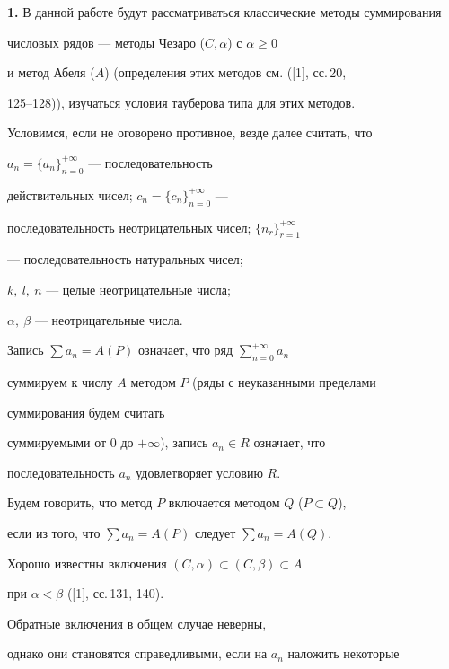 \label{begin}








{\bf 1.} В данной работе будут рассматриваться классические методы суммирования 


числовых рядов --- методы Чезаро ($C,\alpha$) с $\alpha \ge 0$


и метод Абеля ($A$) (определения этих методов см. ([1], сс.\,20,


125--128)), изучаться условия тауберова типа для этих методов.


 


Условимся, если не оговорено противное, везде далее считать, что 


${a_n} = \{a_n \}_{n=0}^{+\infty}$ --- последовательность


действительных чисел; $c_n=\{c_n \}_{n=0}^{+\infty}$ --- 


последовательность неотрицательных чисел; $\{n_r \}_{r=1}^{+\infty}$


--- последовательность натуральных чисел; 


$k,\ l,\ n$ --- целые неотрицательные числа; 


$\alpha,\ \beta$ --- неотрицательные числа. 


Запись $\sum a_n=A (P)$ означает, что ряд $\sum\limits_{n=0}^{+\infty}a_n$ 


суммируем к числу $A$ методом $P$ (ряды с неуказанными пределами 


суммирования будем считать


суммируемыми от 0 до $+\infty$), запись $a_n\in R$ означает, что 


последовательность $a_n$ удовлетворяет условию $R$.





Будем говорить, что метод $P$ включается методом $Q$ ($P\subset Q$), 


если из того, что $\sum a_n=A (P)$ следует $\sum a_n=A (Q)$.





Хорошо известны включения $(C,\alpha)\subset(C,\beta)\subset A$


при $\alpha < \beta$ ([1], сс.\,131, 140). 


Обратные включения в общем случае неверны,


однако они становятся справедливыми, если на ${a_n}$ наложить некоторые 


